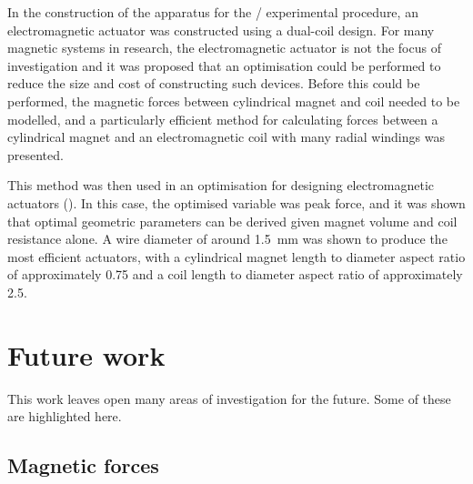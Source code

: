 \documentclass[10pt,a4paper]{memoir}
\begin{document}
In the construction of the apparatus for the \qzs/ experimental procedure, an electromagnetic actuator was constructed using a dual-coil design.
For many magnetic systems in research, the electromagnetic actuator is not the focus of investigation and it was proposed that an optimisation could be performed to reduce the size and cost of constructing such devices.
Before this could be performed, the magnetic forces between cylindrical magnet and coil needed to be modelled, and a particularly efficient method for calculating forces between a cylindrical magnet and an electromagnetic coil with many radial windings was presented.

This method was then used in an optimisation for designing electromagnetic actuators ().
In this case, the optimised variable was peak force, and it was shown that optimal geometric parameters can be derived given magnet volume and coil resistance alone.
A wire diameter of around \SI{1.5}{mm} was shown to produce the most efficient actuators, with a cylindrical magnet length to diameter aspect ratio of approximately \num{0.75} and a coil length to diameter aspect ratio of approximately \num{2.5}.

\section{Future work}

This work leaves open many areas of investigation for the future.
Some of these are highlighted here.

\subsection{Magnetic forces}
\end{document}
